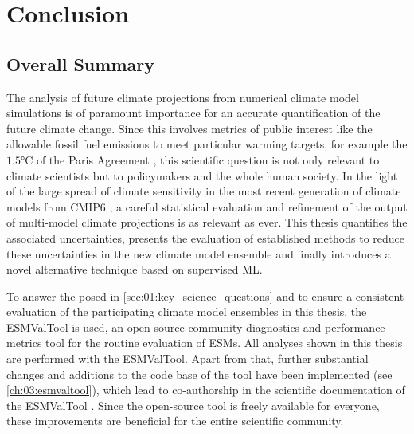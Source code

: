 


\chapter{Conclusion}
\label{ch:07:conclusion}


\section{Overall Summary}
\label{sec:07:overall_summary}

The analysis of future climate projections from numerical climate model
simulations is of paramount importance for an accurate quantification of the
future climate change. Since this involves metrics of public interest like the
allowable fossil fuel emissions to meet particular warming targets, for example
the $1.5 \unit{\degreeCelsius}$ of the Paris Agreement \autocite{UNFCCC2015},
this scientific question is not only relevant to climate scientists but to
policymakers and the whole human society. In the light of the large spread of
climate sensitivity in the most recent generation of climate models from
\acs{CMIP}6 \autocite{Meehl2020}, a careful statistical evaluation and
refinement of the output of multi-model climate projections is as relevant as
ever. This thesis quantifies the associated uncertainties, presents the
evaluation of established methods to reduce these uncertainties in the new
climate model ensemble and finally introduces a novel alternative technique
based on supervised \ac{ML}.

To answer the  posed in
\cref{sec:01:key_science_questions} and to ensure a consistent evaluation of
the participating climate model ensembles in this thesis, the \ac{ESMValTool}
is used, an open-source community diagnostics and performance metrics tool for
the routine evaluation of \acp{ESM}. All analyses shown in this thesis are
performed with the \ac{ESMValTool}. Apart from that, further substantial
changes and additions to the code base of the tool have been implemented (see
\cref{ch:03:esmvaltool}), which lead to co-authorship in the scientific
documentation of the \ac{ESMValTool} \autocite{Eyring2020, Lauer2020,
  Righi2020, Weigel2020}. Since the open-source tool is freely available for
everyone, these improvements are beneficial for the entire scientific
community.

